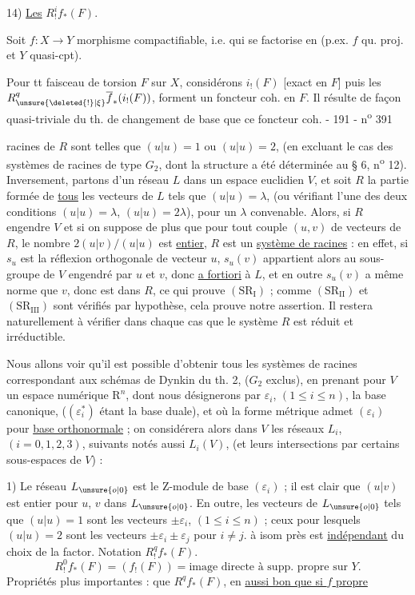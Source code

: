 14) \uline{Les} $R^i_!f_*(F)$.

Soit $f:X\to Y$ morphisme compactifiable, i.e. qui se factorise en
(p.ex. $f$ qu. proj. et $Y$ quasi-cpt).

Pour tt faisceau de torsion $F$ sur $X$, considérons $i_!(F)$ [exact en $F$] puis les $R^q_{\unsure{\deleted{!}|\xi}}\overline f_*(i_!(F))$, forment un foncteur coh. en $F$. Il résulte de façon quasi-triviale du th. de changement de base que ce foncteur coh.
- 191 - \hfill n\textsuperscript{o} 391

racines de $R$ sont telles que $(u|u)=1$ ou $(u|u)=2$, (en excluant le cas des systèmes de racines de type $G_2$, dont la structure a été déterminée au § 6, n\textsuperscript{o} 12). Inversement, partons d'un réseau $L$ dans un espace euclidien $V$, et soit $R$ la partie formée de \uline{tous} les vecteurs de $L$ tels que $(u|u)=\lambda$, (ou vérifiant l'une des deux conditions $(u|u)=\lambda$, $(u|u)=2\lambda$), pour un $\lambda$ convenable. Alors, si $R$ engendre $V$ et si on suppose de plus que pour tout couple $(u,v)$ de vecteurs de $R$, le nombre $2(u|v)/(u|u)$ est \uline{entier}, $R$ est un \uline{système de racines} : en effet, si $s_u$ est la réflexion orthogonale de vecteur $u$, $s_u(v)$ appartient alors au sous-groupe de $V$ engendré par $u$ et $v$, donc \uline{a fortiori} à $L$, et en outre $s_u(v)$ a même norme que $v$, donc est dans $R$, ce qui prouve $(\mathrm{SR}_{\mathrm I})$ ; comme $(\mathrm{SR}_{\mathrm{II}})$ et $(\mathrm{SR}_{\mathrm{III}})$ sont vérifiés par hypothèse, cela prouve notre assertion. Il restera naturellement à vérifier dans chaque cas que le système $R$ est réduit et irréductible.

Nous allons voir qu'il est possible d'obtenir tous les systèmes de racines correspondant aux schémas de Dynkin du th. 2, ($G_2$ exclus), en prenant pour $V$ un espace numérique $\mathrm R^n$, dont nous désignerons par $\varepsilon_i$, $(1\leq i\leq n)$, la base canonique, ($(\varepsilon_i^*)$ étant la base duale), et où la forme métrique admet $(\varepsilon_i)$ pour \uline{base orthonormale} ; on considérera alors dans $V$ les réseaux $L_i$, $(i=0,1,2,3)$, suivants notés aussi $L_i(V)$, (et leurs intersections par certains sous-espaces de $V$) :

1) Le réseau $L_{\unsure{o|0}}$ est le $\mathrm Z$-module de base $(\varepsilon_i)$ ; il est clair que $(u|v)$ est entier pour $u$, $v$ dans $L_{\unsure{o|0}}$. En outre, les vecteurs de $L_{\unsure{o|0}}$ tels que $(u|u)=1$ sont les vecteurs $\pm\varepsilon_i$, $(1\leq i\leq n)$ ; ceux pour lesquels $(u|u)=2$ sont les vecteurs $\pm\varepsilon_i\pm\varepsilon_j$ pour $i\neq j$.
à isom près est \uline{indépendant} du choix de la factor. Notation $R^q_!f_*(F)$.
\[
R^0_!f_*(F)=(f_!(F))=\text{image directe à supp. propre sur }Y.
\]
 Propriétés plus importantes :   que $R^qf_*(F)$, en \uline{aussi bon que si $f$ propre}

